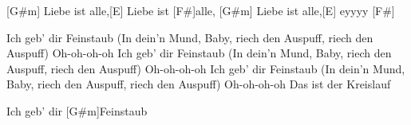 \begin{guitar}
	[G#m] Liebe ist alle,[E] Liebe ist [F#]alle, 
	[G#m] Liebe ist alle,[E] eyyyy [F#]{}
	
	Ich geb' dir Feinstaub
	(In dein'n Mund, Baby, riech den Auspuff, riech den Auspuff) Oh-oh-oh-oh
	Ich geb' dir Feinstaub
	(In dein'n Mund, Baby, riech den Auspuff, riech den Auspuff) Oh-oh-oh-oh
	Ich geb' dir Feinstaub
	(In dein'n Mund, Baby, riech den Auspuff, riech den Auspuff) Oh-oh-oh-oh
	Das ist der Kreislauf
	
	Ich geb' dir [G#m]Feinstaub
\end{guitar}

